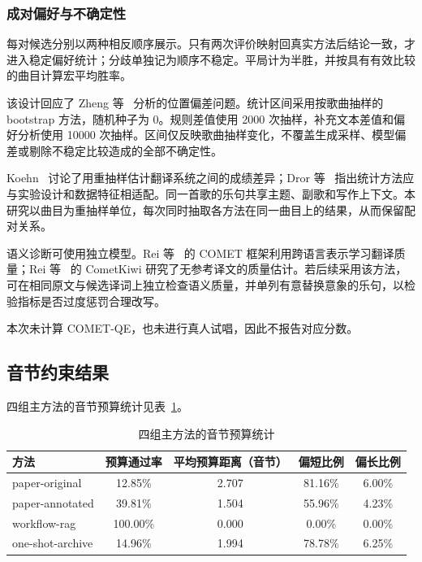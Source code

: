 \documentclass[12pt, a4paper]{ctexart}
\numberwithin{table}{section}
\numberwithin{figure}{section}
\begin{document}
\subsubsection{成对偏好与不确定性}
每对候选分别以两种相反顺序展示。只有两次评价映射回真实方法后结论一致，才进入稳定偏好统计；分歧单独记为顺序不稳定。平局计为半胜，并按具有有效比较的曲目计算宏平均胜率。

该设计回应了 Zheng 等~\cite{zheng-etal-2023-judging} 分析的位置偏差问题。统计区间采用按歌曲抽样的 bootstrap 方法，随机种子为 0。规则差值使用 2000 次抽样，补充文本差值和偏好分析使用 10000 次抽样。区间仅反映歌曲抽样变化，不覆盖生成采样、模型偏差或剔除不稳定比较造成的全部不确定性。

Koehn~\cite{koehn-2004-statistical} 讨论了用重抽样估计翻译系统之间的成绩差异；Dror 等~\cite{dror-etal-2018-hitchhikers} 指出统计方法应与实验设计和数据特征相适配。同一首歌的乐句共享主题、副歌和写作上下文。本研究以曲目为重抽样单位，每次同时抽取各方法在同一曲目上的结果，从而保留配对关系。

语义诊断可使用独立模型。Rei 等~\cite{rei-etal-2020-comet} 的 COMET 框架利用跨语言表示学习翻译质量；Rei 等~\cite{rei-etal-2022-cometkiwi} 的 CometKiwi 研究了无参考译文的质量估计。若后续采用该方法，可在相同原文与候选译词上独立检查语义质量，并单列有意替换意象的乐句，以检验指标是否过度惩罚合理改写。

本次未计算 COMET-QE，也未进行真人试唱，因此不报告对应分数。

\subsection{音节约束结果}
四组主方法的音节预算统计见表~\ref{tab:budget}。
\begin{table}[htbp]
  \centering
  \caption{四组主方法的音节预算统计}
  \label{tab:budget}
  \begin{tabular}{lcccc}
    \toprule
    方法 & 预算通过率 & 平均预算距离（音节） & 偏短比例 & 偏长比例 \\
    \midrule
    paper-original   & 12.85\%  & 2.707 & 81.16\% & 6.00\% \\
    paper-annotated  & 39.81\%  & 1.504 & 55.96\% & 4.23\% \\
    workflow-rag     & 100.00\% & 0.000 & 0.00\%  & 0.00\% \\
    one-shot-archive & 14.96\%  & 1.994 & 78.78\% & 6.25\% \\
    \bottomrule
  \end{tabular}
\end{table}
\end{document}
